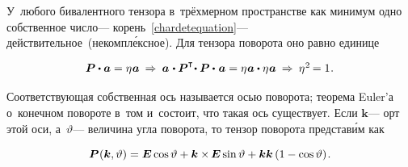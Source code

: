 \begin{otherlanguage}{russian}
У~любого бивалентного тензора в~трёхмерном пространстве как минимум одно собственное число\:--- корень~\eqref{chardetequation}\:--- действительное~(некомпл\'{е}ксное).
Для тензора поворота оно равно единице

\nopagebreak\vspace{1em}\begin{equation*}\begin{array}{c}
\bm{P} \dotp \bm{a} = \eigenvalue \bm{a} \:\Rightarrow\:
\tikzmark{BeginPaBrace} \bm{a} \hspace{.16ex} \dotp \tikzmark{BeginEBrace} \bm{P}^{\T} \tikzmark{EndPaBrace} \hspace{-0.4ex} \dotp \bm{P} \hspace{-0.32ex}\tikzmark{EndEBrace}\hspace{.32ex} \dotp \hspace{.16ex} \bm{a} = \eigenvalue \bm{a} \dotp \eigenvalue \bm{a}
\:\Rightarrow\: \eigenvalue^{2} \hspace{-0.2ex} = 1 \hspace{.1ex} .
\end{array}\end{equation*}

\vspace{-0.5em}\noindent
Соответствующая собственная ось называется осью поворота; теорема Euler’а о~конечном повороте в~том и~состоит, что такая ось существует.
Если ${\bm{k}}$\:--- орт этой оси, а~${\vartheta}$\:--- величина угла поворота, то тензор поворота представ\'{и}м как

\nopagebreak\vspace{-0.1em}\begin{equation}\label{eulerfiniterotation}
\bm{P}\hspace{.1ex}(\bm{k},\vartheta) = \bm{E} \operatorname{cos} \vartheta + \bm{k} \times\hspace{-0.2ex} \bm{E} \operatorname{sin} \vartheta + \bm{k} \bm{k} \left({1 - \operatorname{cos} \vartheta}\right) \hspace{-0.2ex} .
\end{equation}


\end{otherlanguage}
